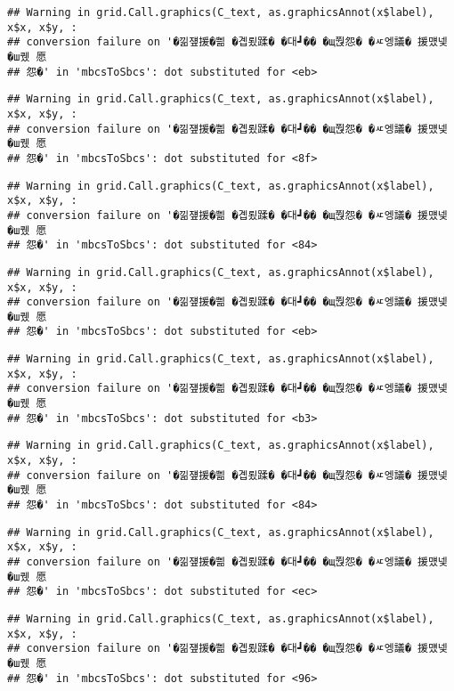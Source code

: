 \documentclass[
]{article}
\begin{document}
\begin{verbatim}
## Warning in grid.Call.graphics(C_text, as.graphicsAnnot(x$label), x$x, x$y, :
## conversion failure on '�낆쟾援�쁾 �곕룄蹂� �대┛�� �щ쭩怨� �ㅼ엥議� 援먰넻�ш퀬 愿
## 怨�' in 'mbcsToSbcs': dot substituted for <eb>
\end{verbatim}

\begin{verbatim}
## Warning in grid.Call.graphics(C_text, as.graphicsAnnot(x$label), x$x, x$y, :
## conversion failure on '�낆쟾援�쁾 �곕룄蹂� �대┛�� �щ쭩怨� �ㅼ엥議� 援먰넻�ш퀬 愿
## 怨�' in 'mbcsToSbcs': dot substituted for <8f>
\end{verbatim}

\begin{verbatim}
## Warning in grid.Call.graphics(C_text, as.graphicsAnnot(x$label), x$x, x$y, :
## conversion failure on '�낆쟾援�쁾 �곕룄蹂� �대┛�� �щ쭩怨� �ㅼ엥議� 援먰넻�ш퀬 愿
## 怨�' in 'mbcsToSbcs': dot substituted for <84>
\end{verbatim}

\begin{verbatim}
## Warning in grid.Call.graphics(C_text, as.graphicsAnnot(x$label), x$x, x$y, :
## conversion failure on '�낆쟾援�쁾 �곕룄蹂� �대┛�� �щ쭩怨� �ㅼ엥議� 援먰넻�ш퀬 愿
## 怨�' in 'mbcsToSbcs': dot substituted for <eb>
\end{verbatim}

\begin{verbatim}
## Warning in grid.Call.graphics(C_text, as.graphicsAnnot(x$label), x$x, x$y, :
## conversion failure on '�낆쟾援�쁾 �곕룄蹂� �대┛�� �щ쭩怨� �ㅼ엥議� 援먰넻�ш퀬 愿
## 怨�' in 'mbcsToSbcs': dot substituted for <b3>
\end{verbatim}

\begin{verbatim}
## Warning in grid.Call.graphics(C_text, as.graphicsAnnot(x$label), x$x, x$y, :
## conversion failure on '�낆쟾援�쁾 �곕룄蹂� �대┛�� �щ쭩怨� �ㅼ엥議� 援먰넻�ш퀬 愿
## 怨�' in 'mbcsToSbcs': dot substituted for <84>
\end{verbatim}

\begin{verbatim}
## Warning in grid.Call.graphics(C_text, as.graphicsAnnot(x$label), x$x, x$y, :
## conversion failure on '�낆쟾援�쁾 �곕룄蹂� �대┛�� �щ쭩怨� �ㅼ엥議� 援먰넻�ш퀬 愿
## 怨�' in 'mbcsToSbcs': dot substituted for <ec>
\end{verbatim}

\begin{verbatim}
## Warning in grid.Call.graphics(C_text, as.graphicsAnnot(x$label), x$x, x$y, :
## conversion failure on '�낆쟾援�쁾 �곕룄蹂� �대┛�� �щ쭩怨� �ㅼ엥議� 援먰넻�ш퀬 愿
## 怨�' in 'mbcsToSbcs': dot substituted for <96>
\end{verbatim}
\end{document}
